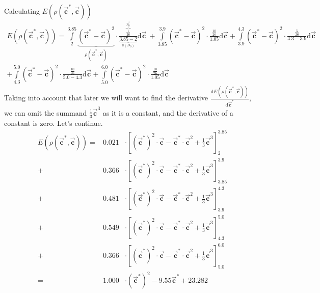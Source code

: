 \documentclass[11pt,a4paper]{article}
\numberwithin{equation}{subsection}
\newcommand{\vecc}{\vec{\textbf{c}}}
\begin{document}
Calculating $E(\rho(\vecc^{*},\vecc))$
\begin{gather*}
E(\rho(\vecc^{*},\vecc)) = \int\limits_{2}^{3.85} \underbrace{(\vecc^{*}-\vecc)^{2}}_{\rho(\vecc^{*},\vecc)} \cdot \frac{\overbrace{\frac{1}{26}}^{p_{0}^{*}}}{\underbrace{3.85-2}_{\mu(D_{0})}} \mathrm{d}\vecc \ + \int\limits_{3.85}^{3.9} (\vecc^{*}-\vecc)^{2} \cdot \frac{\frac{10}{26}}{1.05} \mathrm{d}\vecc + \int\limits_{3.9}^{4.3} (\vecc^{*}-\vecc)^{2} \cdot \frac{\frac{5}{26}}{4.3-3.9} \mathrm{d}\vecc \\
+ \int\limits_{4.3}^{5.0} (\vecc^{*}-\vecc)^{2} \cdot \frac{\frac{10}{26}}{5.0-4.3} \mathrm{d}\vecc + \int\limits_{5.0}^{6.0} (\vecc^{*}-\vecc)^{2} \cdot \frac{\frac{10}{26}}{1.05}  \mathrm{d}\vecc
\end{gather*}
Taking into account that later we will want to find the derivative $\frac{\mathrm{d}E(\rho(\vecc^{*},\vecc))}{\mathrm{d}\vecc^{*}}$, we can omit the summand $\frac{1}{3} \vecc^{3}$ as it is a constant, and the derivative of a constant is zero. Let's continue.
\begin{eqnarray*}
E(\rho(\vecc^{*},\vecc)) =& 0.021 & \cdot\left[ (\vecc^{*})^{2} \cdot \vecc - \vecc^{*} \cdot \vecc^{2} + \frac{1}{3} \vecc^{3}\right]_{2}^{3.85}  \\
+ & 0.366 &\cdot\left[ (\vecc^{*})^{2} \cdot \vecc - \vecc^{*} \cdot \vecc^{2} + \frac{1}{3} \vecc^{3} \right]_{3.85}^{3.9} \\
+ & 0.481 &\cdot\left[ (\vecc^{*})^{2} \cdot \vecc - \vecc^{*} \cdot \vecc^{2} + \frac{1}{3} \vecc^{3} \right]_{3.9}^{4.3}  \\
+ & 0.549 &\cdot\left[ (\vecc^{*})^{2} \cdot \vecc - \vecc^{*} \cdot \vecc^{2} + \frac{1}{3} \vecc^{3} \right]_{4.3}^{5.0}  \\
+ & 0.366 &\cdot\left[ (\vecc^{*})^{2} \cdot \vecc - \vecc^{*} \cdot \vecc^{2} + \frac{1}{3} \vecc^{3} \right]_{5.0}^{6.0}  \\
= & 1.000 &\cdot(\vecc^{*})^{2}-9.55\vecc^{*} + 23.282
\end{eqnarray*}
\end{document}
